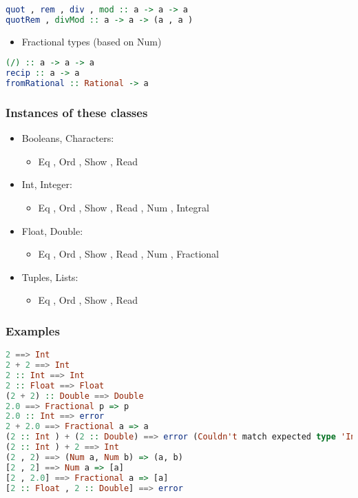 \begin{lstlisting}[language=Haskell]
quot , rem , div , mod :: a -> a -> a
quotRem , divMod :: a -> a -> (a , a )
\end{lstlisting}

\begin{itemize}
\tightlist
\item
  Fractional types (based on Num)
\end{itemize}

\begin{lstlisting}[language=Haskell]
(/) :: a -> a -> a
recip :: a -> a
fromRational :: Rational -> a
\end{lstlisting}

\hypertarget{instances-of-these-classes}{%
\subsubsection{Instances of these
classes}\label{instances-of-these-classes}}

\begin{itemize}
\tightlist
\item
  Booleans, Characters:

  \begin{itemize}
  \tightlist
  \item
    Eq , Ord , Show , Read
  \end{itemize}
\item
  Int, Integer:

  \begin{itemize}
  \tightlist
  \item
    Eq , Ord , Show , Read , Num , Integral
  \end{itemize}
\item
  Float, Double:

  \begin{itemize}
  \tightlist
  \item
    Eq , Ord , Show , Read , Num , Fractional
  \end{itemize}
\item
  Tuples, Lists:

  \begin{itemize}
  \tightlist
  \item
    Eq , Ord , Show , Read
  \end{itemize}
\end{itemize}

\hypertarget{examples}{%
\subsubsection{Examples}\label{examples}}

\begin{lstlisting}[language=Haskell]
2 ==> Int
2 + 2 ==> Int
2 :: Int ==> Int
2 :: Float ==> Float
(2 + 2) :: Double ==> Double
2.0 ==> Fractional p => p
2.0 :: Int ==> error
2 + 2.0 ==> Fractional a => a
(2 :: Int ) + (2 :: Double) ==> error (Couldn't match expected type 'Int' with actual type 'Double')
(2 :: Int ) + 2 ==> Int
(2 , 2) ==> (Num a, Num b) => (a, b)
[2 , 2] ==> Num a => [a]
[2 , 2.0] ==> Fractional a => [a]
[2 :: Float , 2 :: Double] ==> error
\end{lstlisting}
